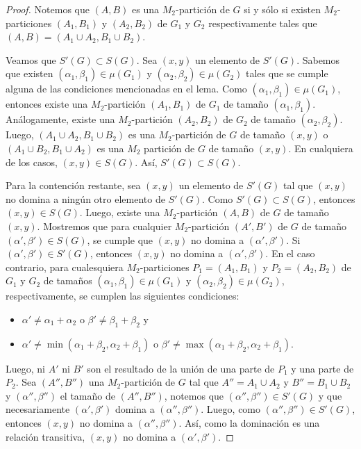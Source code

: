 \begin{proof}
Notemos que $(A,B)$ es una $M_2$-partición de $G$ si y sólo si existen $M_2$-particiones $(A_1,B_1)$ y $(A_2,B_2)$ de $G_1$ y $G_2$ respectivamente tales que $(A,B)=(A_1\cup A_2, B_1 \cup B_2)$.

Veamos que $S'(G)\subset S(G)$. Sea $(x,y)$ un elemento de $S'(G)$. Sabemos que existen $(\alpha_1,\beta_1)\in \mu(G_1)$ y $(\alpha_2,\beta_2)\in \mu(G_2)$ tales que se cumple alguna de las condiciones mencionadas en el lema. Como $(\alpha_1,\beta_1)\in \mu(G_1)$, entonces existe una $M_2$-partición $(A_1,B_1)$ de $G_1$ de tamaño $(\alpha_1, \beta_1)$. Análogamente, existe una $M_2$-partición $(A_2,B_2)$ de $G_2$ de tamaño $(\alpha_2, \beta_2)$. Luego, $(A_1\cup A_2, B_1 \cup B_2)$ es una $M_2$-partición de $G$ de tamaño $(x,y)$ o $(A_1\cup B_2, B_1 \cup A_2)$ es una $M_2$ partición de $G$ de tamaño $(x,y)$. En cualquiera de los casos, $(x,y)\in S(G)$. Así, $S'(G)\subset S(G)$.

Para la contención restante, sea $(x,y)$ un elemento de $S'(G)$ tal que $(x,y)$ no domina a ningún otro elemento de $S'(G)$. Como $S'(G)\subset S(G)$, entonces $(x,y)\in S(G)$. Luego, existe una $M_2$-partición $(A,B)$ de $G$ de tamaño $(x,y)$. Mostremos que para cualquier $M_2$-partición $(A',B')$ de $G$ de tamaño $(\alpha',\beta')\in S(G)$, se cumple que $(x,y)$ no domina a $(\alpha',\beta')$. Si $(\alpha',\beta')\in S'(G)$, entonces $(x,y)$ no domina a $(\alpha',\beta')$. En el caso contrario, para cualesquiera $M_2$-particiones $P_1=(A_1,B_1)$ y $P_2=(A_2,B_2)$ de $G_1$ y $G_2$ de tamaños $(\alpha_1,\beta_1)\in \mu(G_1)$ y $(\alpha_2,\beta_2)\in \mu(G_2)$, respectivamente, se cumplen las siguientes condiciones:
\begin{itemize}
    \item $\alpha' \neq \alpha_1+\alpha_2$ o $\beta' \neq \beta_1 + \beta_2$ y
    \item $\alpha' \neq \min (\alpha_1+\beta_2, \alpha_2+\beta_1)$ o  $\beta' \neq \max (\alpha_1+\beta_2, \alpha_2+\beta_1)$.
\end{itemize}
Luego, ni $A'$ ni $B'$ son el resultado de la unión de una parte de $P_1$ y una parte de $P_2$. Sea $(A'',B'')$ una $M_2$-partición de $G$ tal que $A''=A_1\cup A_2$ y $B''=B_1\cup B_2$ y $(\alpha'', \beta'')$ el tamaño de $(A'',B'')$, notemos que $(\alpha'', \beta'')\in S'(G)$ y que necesariamente $(\alpha', \beta')$ domina a $(\alpha'', \beta'')$. Luego, como $(\alpha'', \beta'')\in S'(G)$, entonces $(x,y)$ no domina a $(\alpha'', \beta'')$. Así, como la dominación es una relación transitiva, $(x,y)$ no domina a $(\alpha', \beta')$.


\end{proof}

